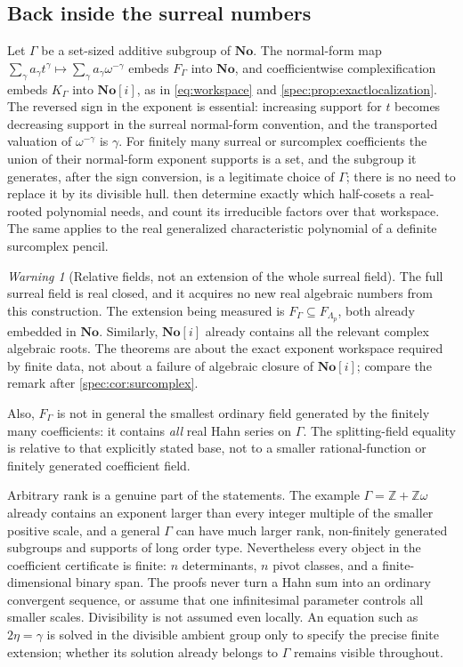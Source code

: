 \documentclass[11pt,a4paper]{article}
\numberwithin{equation}{section}
\theoremstyle{definition}
\theoremstyle{remark}
\newtheorem{warning}[warning]{Warning}
\newcommand{\No}{\mathbf{No}}
\newcommand{\SC}{\mathbf{No}[i]}
\newcommand{\Z}{\mathbb Z}
\begin{document}
\subsection{Back inside the surreal numbers}
\label{spec:hank:sub:transport}

Let $\Gamma$ be a set-sized additive subgroup of $\No$. The normal-form map
$\sum_\gamma a_\gamma t^\gamma\mapsto\sum_\gamma a_\gamma\omega^{-\gamma}$ embeds
$F_\Gamma$ into $\No$, and coefficientwise complexification embeds $K_\Gamma$
into $\SC$, as in \eqref{eq:workspace} and
\cref{spec:prop:exactlocalization}. The reversed sign in the exponent is
essential: increasing support for $t$ becomes decreasing support in the
surreal normal-form convention, and the transported valuation of
$\omega^{-\gamma}$ is $\gamma$. For finitely many surreal or surcomplex
coefficients the union of their normal-form exponent supports is a set, and
the subgroup it generates, after the sign conversion, is a legitimate choice
of $\Gamma$; there is no need to replace it by its divisible hull.
 then determine exactly which
half-cosets a real-rooted polynomial needs, and count its irreducible factors
over that workspace. The same applies to the real generalized characteristic
polynomial of a definite surcomplex pencil.

\begin{warning}[Relative fields, not an extension of the whole surreal field]
\label{spec:hank:warn:relative}
The full surreal field is real closed, and it acquires no new real algebraic
numbers from this construction. The extension being measured is
$F_\Gamma\subseteq F_{\Lambda_p}$, both already embedded in $\No$. Similarly,
$\SC$ already contains all the relevant complex algebraic roots. The theorems
are about the exact exponent workspace required by finite data, not about a
failure of algebraic closure of $\SC$; compare the remark after
\cref{spec:cor:surcomplex}.
\end{warning}

Also, $F_\Gamma$ is not in general the smallest ordinary field generated by
the finitely many coefficients: it contains \emph{all} real Hahn series on
$\Gamma$. The splitting-field equality is relative to that explicitly stated
base, not to a smaller rational-function or finitely generated coefficient
field.

Arbitrary rank is a genuine part of the statements. The example
$\Gamma=\Z+\Z\omega$ already contains an exponent larger than every integer
multiple of the smaller positive scale, and a general $\Gamma$ can have much
larger rank, non-finitely generated subgroups and supports of long order
type. Nevertheless every object in the coefficient certificate is finite: $n$
determinants, $n$ pivot classes, and a finite-dimensional binary span. The
proofs never turn a Hahn sum into an ordinary convergent sequence, or assume
that one infinitesimal parameter controls all smaller scales. Divisibility is
not assumed even locally. An equation such as $2\eta=\gamma$ is solved in the
divisible ambient group only to specify the precise finite extension; whether
its solution already belongs to $\Gamma$ remains visible throughout.
\end{document}
